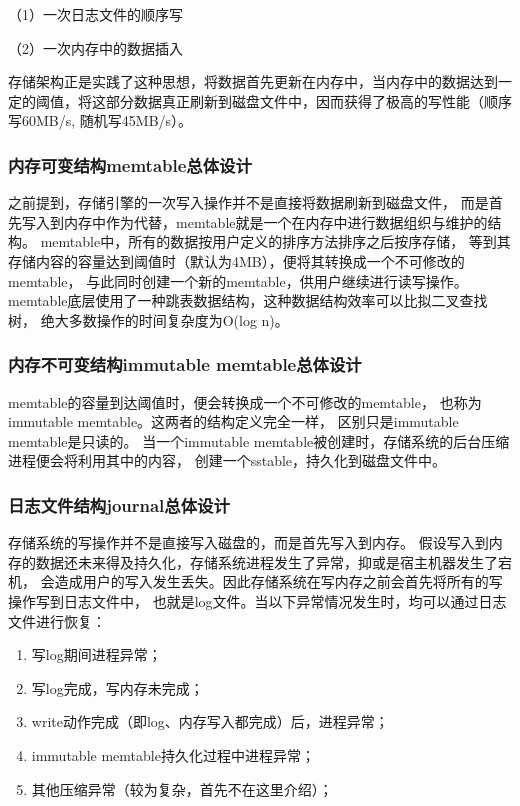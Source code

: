 		（1）{一次日志文件的顺序写}

		（2）{一次内存中的数据插入}

		存储架构正是实践了这种思想，将数据首先更新在内存中，当内存中的数据达到一定的阈值，将这部分数据真正刷新到磁盘文件中，因而获得了极高的写性能（顺序写60MB/s, 随机写45MB/s）。

		\subsubsection{内存可变结构memtable总体设计}
		
		之前提到，存储引擎的一次写入操作并不是直接将数据刷新到磁盘文件，
		而是首先写入到内存中作为代替，memtable就是一个在内存中进行数据组织与维护的结构。
		memtable中，所有的数据按用户定义的排序方法排序之后按序存储，
		等到其存储内容的容量达到阈值时（默认为4MB），便将其转换成一个不可修改的memtable，
		与此同时创建一个新的memtable，供用户继续进行读写操作。
		memtable底层使用了一种跳表数据结构，这种数据结构效率可以比拟二叉查找树，
		绝大多数操作的时间复杂度为O(log n)。

		\subsubsection{内存不可变结构immutable memtable总体设计}

		memtable的容量到达阈值时，便会转换成一个不可修改的memtable，
		也称为immutable memtable。这两者的结构定义完全一样，
		区别只是immutable memtable是只读的。
		当一个immutable memtable被创建时，存储系统的后台压缩进程便会将利用其中的内容，
		创建一个sstable，持久化到磁盘文件中。

		\subsubsection{日志文件结构journal总体设计}

		存储系统的写操作并不是直接写入磁盘的，而是首先写入到内存。
		假设写入到内存的数据还未来得及持久化，存储系统进程发生了异常，抑或是宿主机器发生了宕机，
		会造成用户的写入发生丢失。因此存储系统在写内存之前会首先将所有的写操作写到日志文件中，
		也就是log文件。当以下异常情况发生时，均可以通过日志文件进行恢复：

		\begin{enumerate}
			\item 写log期间进程异常；
			\item 写log完成，写内存未完成；
			\item write动作完成（即log、内存写入都完成）后，进程异常；
			\item immutable memtable持久化过程中进程异常；
			\item 其他压缩异常（较为复杂，首先不在这里介绍）；
		\end{enumerate}
	
